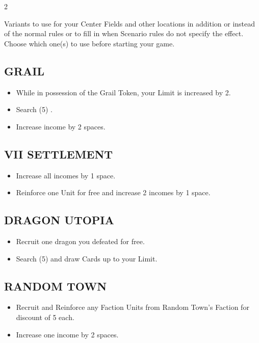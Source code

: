 
\begin{multicols*}{2}

Variants to use for your Center Fields and other locations in addition or instead of the normal rules or to fill in when Scenario rules do not specify the effect. Choose which one(s) to use before starting your game.

\subsection*{\MakeUppercase{Grail}}
\begin{itemize}
  \item While in possession of the Grail Token, your  Limit is increased by 2.
  \item Search (5) .
  \item Increase  income by 2 spaces.
\end{itemize}

\subsection*{\MakeUppercase{VII Settlement}}
\begin{itemize}
  \item Increase all incomes by 1 space.
  \item Reinforce one  Unit for free and increase 2 incomes by 1 space.
\end{itemize}

\subsection*{\MakeUppercase{Dragon Utopia}}
\begin{itemize}
  \item Recruit one dragon you defeated for free.
  \item Search (5)  and draw Cards up to your  Limit.
\end{itemize}

\subsection*{\MakeUppercase{Random Town}}
\begin{itemize}
  \item Recruit and Reinforce any Faction Units from Random Town's Faction for discount of 5  each.
  \item Increase one income by 2 spaces.
\end{itemize}


\end{multicols*}
